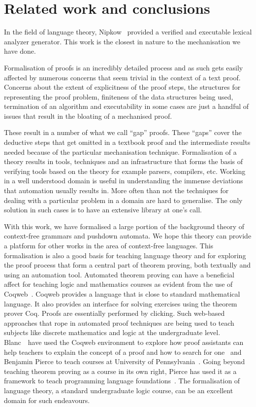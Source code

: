 \section{Related work and conclusions}

In the field of language theory, Nipkow~\citep{nipkow98} provided a
verified and executable lexical analyzer generator. This work is the
closest in nature to the mechanisation we have done.

Formalisation of proofs is an incredibly detailed process and as such
gets easily affected by numerous concerns that seem trivial in the
context of a text proof. Concerns about the extent of explicitness of
the proof steps, the structures for representing the proof problem,
finiteness of the data structures being used, termination of an
algorithm and executability in some cases are just a handful of issues
that result in the bloating of a mechanised proof.

These result in a number of what we call ``gap'' proofs. These
``gaps'' cover the deductive steps that get omitted in a textbook
proof and the intermediate results needed because of the particular
mechanisation technique. Formalisation of a theory results in tools,
techniques and an infrastructure that forms the basis of verifying
tools based on the theory for example parsers, compilers, etc. Working
in a well understood domain is useful in understanding the immense
deviations that automation usually results in.  More often than not
the techniques for dealing with a particular problem in a domain are
hard to generalise. The only solution in such cases is to have an
extensive library at one's call.

With this work, we have formalised a large portion of the background
theory of context-free grammars and pushdown automata. We hope this
theory can provide a platform for other works in the area of
context-free languages. This formalisation is also a good basis for
teaching language theory and for exploring the proof process that form
a central part of theorem proving, both textually and using an
automation tool. Automated theorem proving can have a beneficial
affect for teaching logic and mathematics courses as evident from the
use of Coqweb~\citep{coqweb}.  Coqweb provides a language that is
close to standard mathematical language. It also provides an interface
for solving exercises using the theorem prover Coq. Proofs are
essentially performed by clicking. Such web-based approaches that rope
in automated proof techniques are being used to teach subjects like
discrete mathematics and logic at the undergraduate
level. Blanc~\et~have used the Coqweb environment to explore how proof
assistants can help teachers to explain the concept of a proof and how
to search for one~\citep{pate07} and Benjamin Pierce to teach courses
at University of Pennsylvania~\citep{Pierce:LambdaTA-ITP}. Going
beyond teaching theorem proving as a course in its own right, Pierce
has used it as a framework to teach programming language
foundations~\citep{Pierce:LambdaTA}. The formalisation of language
theory, a standard undergraduate logic course, can be an excellent
domain for such endeavours.

